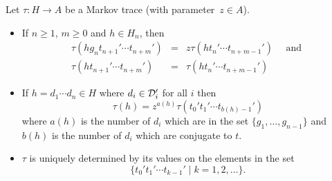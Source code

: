 \begin{lem}
Let $\tau:H \rightarrow A$ be a Markov trace (with parameter~$z \in A$).
\begin{itemize}
\item[(a)] If $n \geq 1$, $m \geq 0$ and $h \in H_n$, then 
\begin{eqnarray*}
 \tau(hg_nt_{n+1}' \cdots t_{n+m}') & = & z \tau(ht_n' \cdots 
t_{n+m-1}') \quad \mbox{ and }\\
 \tau(ht_{n+1}' \cdots t_{n+m}') & = &  \tau(ht_n' \cdots 
t_{n+m-1}') \end{eqnarray*}
\item[(b)] If $h=d_1 \cdots d_n \in H$ where $d_i \in {\cal D}_i'$ for all
$i$ then  \[ \tau(h)=z^{a(h)} \tau(t_0't_1' \cdots  t_{b(h)-1}')\] where
$a(h)$  is    the   number  of    $d_i$    which   are  in  the    set
$\{g_1,\ldots,g_{n-1}\}$  and $b(h)$ is the number  of $d_i$ which are
conjugate to $t$.
\item[(c)] $\tau$ is uniquely determined by its values on the elements 
in the set \[ \{ t_0' t_1' \cdots t_{k-1}' \mid k=1,2,\ldots \}.\]
\end{itemize}
\end{lem}

